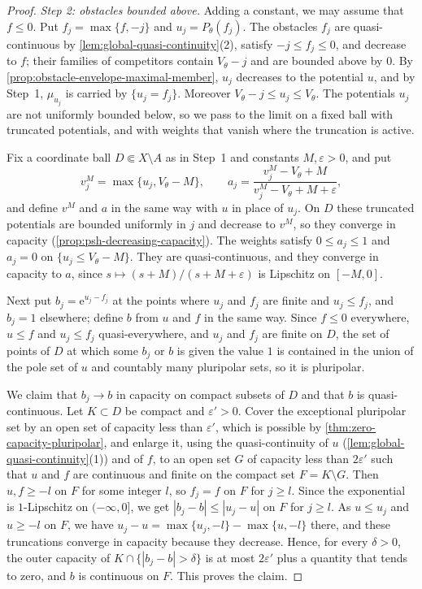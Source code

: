 \begin{proof}
\emph{Step 2: obstacles bounded above.} Adding a constant, we may assume that $f\leq0$. Put $f_j=\max\{f,-j\}$ and $u_j=P_\theta(f_j)$. The obstacles $f_j$ are quasi-continuous by \cref{lem:global-quasi-continuity}(2), satisfy $-j\leq f_j\leq0$, and decrease to $f$; their families of competitors contain $V_\theta-j$ and are bounded above by $0$. By \cref{prop:obstacle-envelope-maximal-member}, $u_j$ decreases to the potential $u$, and by Step~1, $\mu_{u_j}$ is carried by $\{u_j=f_j\}$. Moreover $V_\theta-j\leq u_j\leq V_\theta$. The potentials $u_j$ are not uniformly bounded below, so we pass to the limit on a fixed ball with truncated potentials, and with weights that vanish where the truncation is active.

Fix a coordinate ball $D\Subset X\setminus A$ as in Step~1 and constants $M,\varepsilon>0$, and put
\[
 v_j^M=\max\{u_j,V_\theta-M\},\qquad
 a_j=\frac{v_j^M-V_\theta+M}{v_j^M-V_\theta+M+\varepsilon},
\]
and define $v^M$ and $a$ in the same way with $u$ in place of $u_j$. On $D$ these truncated potentials are bounded uniformly in $j$ and decrease to $v^M$, so they converge in capacity (\cref{prop:psh-decreasing-capacity}). The weights satisfy $0\leq a_j\leq1$ and $a_j=0$ on $\{u_j\leq V_\theta-M\}$. They are quasi-continuous, and they converge in capacity to $a$, since $s\mapsto(s+M)/(s+M+\varepsilon)$ is Lipschitz on $[-M,0]$.

Next put $b_j=\mathrm e^{u_j-f_j}$ at the points where $u_j$ and $f_j$ are finite and $u_j\leq f_j$, and $b_j=1$ elsewhere; define $b$ from $u$ and $f$ in the same way. Since $f\leq0$ everywhere, $u\leq f$ and $u_j\leq f_j$ quasi-everywhere, and $u_j$ and $f_j$ are finite on $D$, the set of points of $D$ at which some $b_j$ or $b$ is given the value $1$ is contained in the union of the pole set of $u$ and countably many pluripolar sets, so it is pluripolar.

We claim that $b_j\to b$ in capacity on compact subsets of $D$ and that $b$ is quasi-continuous. Let $K\subset D$ be compact and $\varepsilon'>0$. Cover the exceptional pluripolar set by an open set of capacity less than $\varepsilon'$, which is possible by \cref{thm:zero-capacity-pluripolar}, and enlarge it, using the quasi-continuity of $u$ (\cref{lem:global-quasi-continuity}(1)) and of $f$, to an open set $G$ of capacity less than $2\varepsilon'$ such that $u$ and $f$ are continuous and finite on the compact set $F=K\setminus G$. Then $u,f\geq-l$ on $F$ for some integer $l$, so $f_j=f$ on $F$ for $j\geq l$. Since the exponential is $1$-Lipschitz on $(-\infty,0]$, we get $|b_j-b|\leq|u_j-u|$ on $F$ for $j\geq l$. As $u\leq u_j$ and $u\geq-l$ on $F$, we have $u_j-u=\max\{u_j,-l\}-\max\{u,-l\}$ there, and these truncations converge in capacity because they decrease. Hence, for every $\delta>0$, the outer capacity of $K\cap\{|b_j-b|>\delta\}$ is at most $2\varepsilon'$ plus a quantity that tends to zero, and $b$ is continuous on $F$. This proves the claim.


\end{proof}
